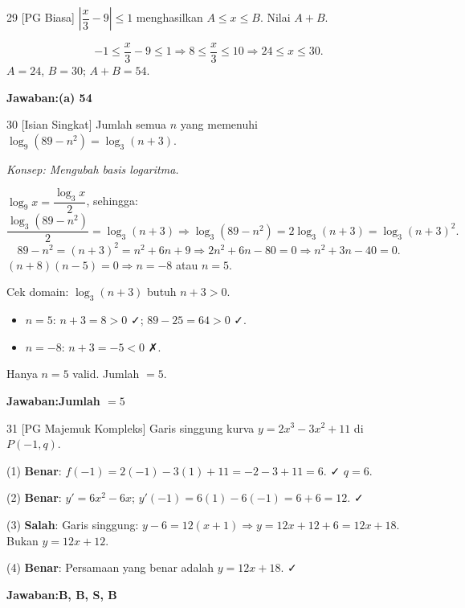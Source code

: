 \documentclass[11pt]{article}
\newcommand{\jawaban}[1]{\textbf{Jawaban:}\enspace\colorbox{gold!30}{\textbf{#1}}}
\newcommand{\konsep}[1]{\textit{Konsep: #1.}}
\begin{document}
\begin{soal}{29 \normalfont\small[PG Biasa]}
$\left|\dfrac{x}{3}-9\right|\leq1$ menghasilkan $A\leq x\leq B$. Nilai $A+B$.
\end{soal}
\begin{pembox}
\[
-1\leq\frac{x}{3}-9\leq1\Rightarrow8\leq\frac{x}{3}\leq10\Rightarrow24\leq x\leq30.
\]
$A=24$, $B=30$; $A+B=54$.

\jawaban{(a) 54}
\end{pembox}

\begin{soal}{30 \normalfont\small[Isian Singkat]}
Jumlah semua $n$ yang memenuhi $\log_9(89-n^2)=\log_3(n+3)$.
\end{soal}
\begin{pembox}
\konsep{Mengubah basis logaritma}

$\log_9 x=\dfrac{\log_3 x}{2}$, sehingga:
\[
\frac{\log_3(89-n^2)}{2}=\log_3(n+3)\Rightarrow\log_3(89-n^2)=2\log_3(n+3)=\log_3(n+3)^2.
\]
\[
89-n^2=(n+3)^2=n^2+6n+9\Rightarrow2n^2+6n-80=0\Rightarrow n^2+3n-40=0.
\]
$(n+8)(n-5)=0\Rightarrow n=-8$ atau $n=5$.

Cek domain: $\log_3(n+3)$ butuh $n+3>0$.
\begin{itemize}[leftmargin=*,nosep]
\item $n=5$: $n+3=8>0$ ✓; $89-25=64>0$ ✓.
\item $n=-8$: $n+3=-5<0$ ✗.
\end{itemize}
Hanya $n=5$ valid. Jumlah $=5$.

\jawaban{Jumlah $=5$}
\end{pembox}


\begin{soal}{31 \normalfont\small[PG Majemuk Kompleks]}
Garis singgung kurva $y=2x^3-3x^2+11$ di $P(-1,q)$.
\end{soal}
\begin{pembox}
(1) \textbf{Benar}: $f(-1)=2(-1)-3(1)+11=-2-3+11=6$. ✓ $q=6$.

(2) \textbf{Benar}: $y'=6x^2-6x$; $y'(-1)=6(1)-6(-1)=6+6=12$. ✓

(3) \textbf{Salah}: Garis singgung: $y-6=12(x+1)\Rightarrow y=12x+12+6=12x+18$. Bukan $y=12x+12$.

(4) \textbf{Benar}: Persamaan yang benar adalah $y=12x+18$. ✓

\jawaban{B, B, S, B}
\end{pembox}
\end{document}
